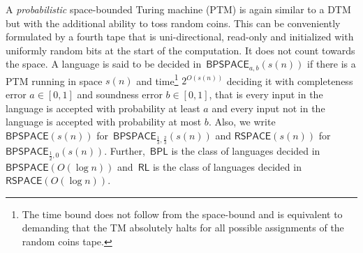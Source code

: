 \documentclass[10pt,a4paper]{article}
\begin{document}
A \emph{probabilistic} space-bounded Turing machine (PTM) is again similar to a DTM but with the additional ability to toss random coins. This can be conveniently formulated by a fourth tape that is uni-directional, read-only and initialized with uniformly random bits at the start of the computation. It does not count towards the space.
A language is said to be decided in $\mathsf{BPSPACE}_{a,b}(s(n))$ if there is a PTM running in space $s(n)$ and time\footnote{The time bound does not follow from the space-bound and is equivalent to demanding that the TM absolutely halts for all possible assignments of the random coins tape.} $2^{O(s(n))}$ deciding it with completeness error $a\in[0,1]$ and soundness error $b\in[0,1]$, that is every input in the language is accepted with probability at least $a$ and every input not in the language is accepted with probability at most $b$.
Also, we write $\mathsf{BPSPACE}(s(n))$ for $\mathsf{BPSPACE}_{\frac{1}{3},\frac{2}{3}}(s(n))$ and $\mathsf{RSPACE}(s(n))$ for $\mathsf{BPSPACE}_{\frac{1}{2},0}(s(n))$. Further, $\mathsf{BPL}$ is the class of languages decided in $\mathsf{BPSPACE}(O(\log n))$ and $\mathsf{RL}$ is the class of languages decided in $\mathsf{RSPACE}(O(\log n))$.\par
\end{document}
